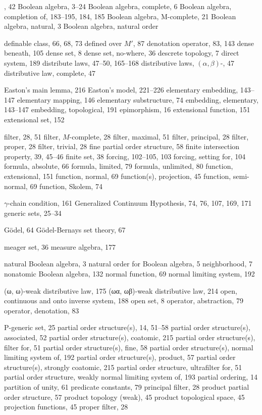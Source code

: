 , 42
Boolean algebra, 3–24
Boolean algebra, complete, 6
Boolean algebra, completion of, 183–195, 184, 185
Boolean algebra, M-complete, 21
Boolean algebra, natural, 3
Boolean algebra, natural order

definable class, 66, 68, 73
defined over $M'$, 87
denotation operator, 83, 143
dense beneath, 105
dense set, 8
dense set, no-where, 36
descrete topology, 7
direct system, 189
distribute laws, 47–50, 165–168
distributive laws, $(\alpha, \beta)$-, 47
distributive law, complete, 47

Easton’s main lemma, 216
Easton’s model, 221–226
elementary embedding, 143–147
elementary mapping, 146
elementary substructure, 74
embedding, elementary, 143–147
embedding, topological, 191
epimorphism, 16
extensional function, 151
extensional set, 152

filter, 28, 51
filter, $M$-complete, 28
filter, maximal, 51
filter, principal, 28
filter, proper, 28
filter, trivial, 28
fine partial order structure, 58
finite intersection property, 39, 45–46
finite set, 38
forcing, 102–105, 103
forcing, setting for, 104
formula, absolute, 66
formula, limited, 79
formula, unlimited, 80
function, extensional, 151
function, normal, 69
function(s), projection, 45
function, semi-normal, 69
function, Skolem, 74

$\gamma$-chain condition, 161
Generalized Continuum Hypothesis, 74, 76, 107, 169, 171
generic sets, 25–34

Gödel, 64
Gödel-Bernays set theory, 67

meager set, 36
measure algebra, 177

natural Boolean algebra, 3
natural order for Boolean algebra, 5
neighborhood, 7
nonatomic Boolean algebra, 132
normal function, 69
normal limiting system, 192

(ω, ω)-weak distributive law, 175
(ωα, ωβ)-weak distributive law, 214
open, continuous and onto inverse system, 188
open set, 8
operator, abstraction, 79
operator, denotation, 83

P-generic set, 25
partial order structure(s), 14, 51–58
partial order structure(s), associated, 52
partial order structure(s), coatomic, 215
partial order structure(s), filter for, 51
partial order structure(s), fine, 58
partial order structure(s), normal limiting system of, 192
partial order structure(s), product, 57
partial order structure(s), strongly coatomic, 215
partial order structure, ultrafilter for, 51
partial order structure, weakly normal limiting system of, 193
partial ordering, 14
partition of unity, 61
predicate constants, 79
principal filter, 28
product partial order structure, 57
product topology (weak), 45
product topological space, 45
projection functions, 45
proper filter, 28

